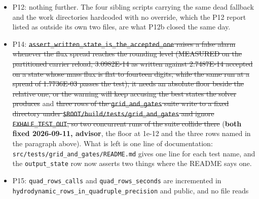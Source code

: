 \documentclass[english,a4paper]{my_memo}
\begin{document}
\begin{itemize}
{  default off and a rounding control experiment nothing is adopted from.}
  (\textbf{fixed 2026-09-11, P15}, which was also the Codex review\textquotesingle s second
  finding: the kind-generic rows store their own face departures, and the continuation
  combination is refused rather than weighted, because the two schemes
  reconstruct different faces and no single pair of departures satisfies the
  blended row identity. The momentum terms are still not handed back by the
  kind-generic rows, and they are not read from a previous evaluation either: the one
  expression of each is evaluated at the call site for the state just
  assembled, which is the P4 entry above.) The
  marching stop of \texttt{mol\_carrier} reports a momentum measure of 1.979E+00
  against a scale that is now the largest physical term in the layer, which
  is commensurable with the mass and energy entries in a way it was not;
  whether the marching stop should quote it at all is an acceptance
  question.
\item
  P12: nothing further. The four sibling scripts carrying the same dead
  fallback and the work directories hardcoded with no override, which the
  P12 report listed as outside its own two files, are what P12b closed the
  same day.
\item
  P14: \st{\mbox{\texttt{assert\_written\_state\_is\_the\_accepted\_one}} raises a false alarm
  whenever the flux spread reaches the rounding level (MEASURED on the
  partitioned carrier reload, 3.0982E-14 as written against 2.7487E-14
  accepted on a state whose mass flux is flat to fourteen digits, while the
  same run at a spread of 1.7736E-03 passes the test); it needs an absolute
  floor beside the relative one, or the warning will keep accusing the best
  states the solver produces} and \st{three rows of the \mbox{\texttt{grid\_and\_gates}} suite
  write to a fixed directory under \mbox{\texttt{\$ROOT/build/tests/grid\_and\_gates}} and
  ignore \mbox{\texttt{EXHALE\_TEST\_OUT}}, so two concurrent runs of the suite collide
  there} (\textbf{both fixed 2026-09-11, advisor}, the floor at 1e-12 and the
  three rows named in the paragraph above). What is left is one line of
  documentation: \texttt{src/tests/grid\_and\_gates/README.md} gives one line for each
  test name, and the \texttt{output\_state} row now asserts two things where the
  README says one.
\item
  P15: \texttt{quad\_rows\_calls} and \texttt{quad\_rows\_seconds} are incremented in
  \texttt{hydrodynamic\_rows\_in\_quadruple\_precision} and public, and no file reads

\end{itemize}
\end{document}
